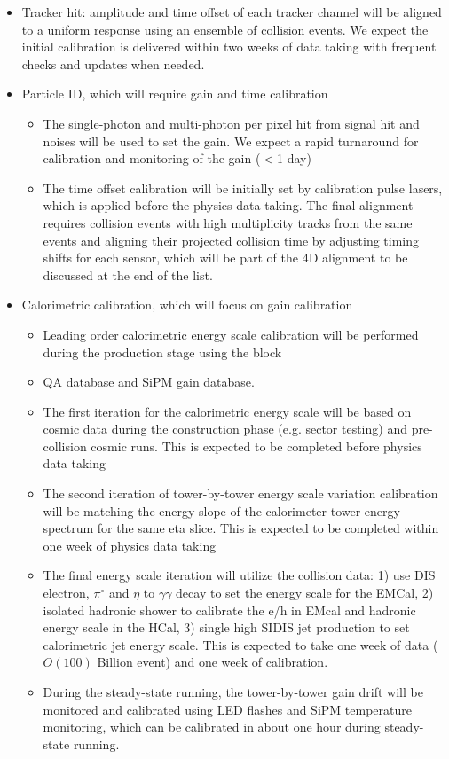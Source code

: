 \begin{itemize}
\item Tracker hit: amplitude and time offset of each tracker channel will be aligned to a uniform response using an ensemble of collision events. We expect the initial calibration is delivered within two weeks of data taking with frequent checks and updates when needed. 
\item Particle ID, which will require gain and time calibration
\begin{itemize}
  \item The single-photon and multi-photon per pixel hit from signal hit and noises will be used to set the gain. We expect a rapid turnaround for calibration and monitoring of the gain ($<$1 day)
  \item The time offset calibration will be initially set by calibration pulse lasers, which is applied before the physics data taking. The final alignment requires collision events with high multiplicity tracks from the same events and aligning their projected collision time by adjusting timing shifts for each sensor, which will be part of the 4D alignment to be discussed at the end of the list. 
\end{itemize}
\item Calorimetric calibration, which will focus on gain calibration
\begin{itemize}
  \item Leading order calorimetric energy scale calibration will be performed during the production stage using the block 
  \item QA database and SiPM gain database. 
  \item The first iteration for the calorimetric energy scale will be based on cosmic data during the construction phase (e.g. sector testing) and pre-collision cosmic runs. This is expected to be completed before physics data taking
  \item The second iteration of tower-by-tower energy scale variation calibration will be matching the energy slope of the calorimeter tower energy spectrum for the same eta slice.   This is expected to be completed within one week of physics data taking
  \item The final energy scale iteration will utilize the collision data: 1) use DIS electron, $\pi^{\circ}$ and $\eta$ to $\gamma \gamma$ decay to set the energy scale for the EMCal, 2) isolated hadronic shower to calibrate the e/h in EMcal and hadronic energy scale in the HCal, 3) single high SIDIS jet production to set calorimetric jet energy scale. This is expected to take one week of data ($O(100)$ Billion event) and one week of calibration. 
  \item During the steady-state running, the tower-by-tower gain drift will be monitored and calibrated using LED flashes and SiPM temperature monitoring, which can be calibrated in about one hour during steady-state running. 
\end{itemize}


\end{itemize}
